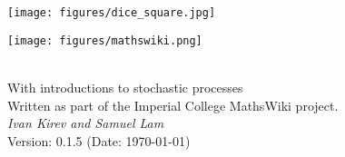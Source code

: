 \hypersetup{pageanchor=false}
\begin{titlepage}
  \texttt{[image: figures/dice\_square.jpg]}
  \colorbox{imperialorange}{\makebox[\linewidth][c]{\shortstack[c]{\vspace{0.5in}}}} \\[4ex]
  \begin{center}
  \begin{minipage}[l]{0.25\linewidth}
     \texttt{[image: figures/mathswiki.png]}
  \end{minipage}
  \hspace{.05\linewidth}
  \begin{minipage}[l]{0.5\linewidth}
    { \\[.5ex]
    {\Large With introductions to stochastic processes} \\[.5ex]
    {\normalsize Written as part of the Imperial College MathsWiki project.} \\[4ex]
    \textit{\large Ivan Kirev and Samuel Lam} \\[1ex]
    Version: 0.1.5 (Date: \today)}
  \end{minipage}
  \end{center}
\end{titlepage}

\restoregeometry
\newpage 

\thispagestyle{empty}
\phantom{This page has been left intentionally blank.}
\newpage